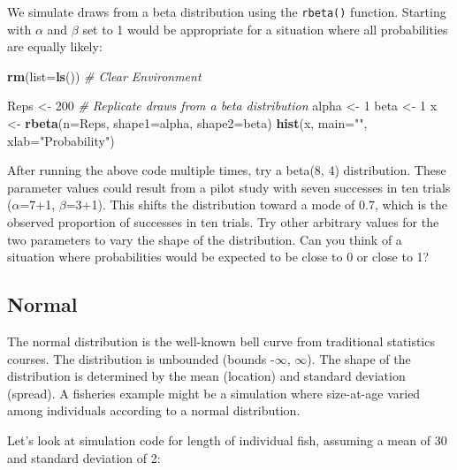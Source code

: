 \documentclass[
]{krantz}
\makeatletter
\newenvironment{Shaded}{\begin{snugshade}}{\end{snugshade}}
\newcommand{\AttributeTok}[1]{\textcolor[rgb]{0.27,0.27,0.27}{#1}}
\newcommand{\CommentTok}[1]{\textcolor[rgb]{0.37,0.37,0.37}{\textit{#1}}}
\newcommand{\DecValTok}[1]{\textcolor[rgb]{0.06,0.06,0.06}{#1}}
\newcommand{\FunctionTok}[1]{\textcolor[rgb]{0.27,0.27,0.27}{\textbf{#1}}}
\newcommand{\NormalTok}[1]{#1}
\newcommand{\OtherTok}[1]{\textcolor[rgb]{0.37,0.37,0.37}{#1}}
\newcommand{\StringTok}[1]{\textcolor[rgb]{0.5,0.5,0.5}{#1}}
\newenvironment{kframe}{%
\medskip{}
\setlength{\fboxsep}{.8em}
 \def\at@end@of@kframe{}%
 \ifinner\ifhmode%
  \def\at@end@of@kframe{\end{minipage}}%
  \begin{minipage}{\columnwidth}%
 \fi\fi%
 \def\FrameCommand##1{\hskip\@totalleftmargin \hskip-\fboxsep
 \colorbox{shadecolor}{##1}\hskip-\fboxsep
     \hskip-\linewidth \hskip-\@totalleftmargin \hskip\columnwidth}%
 \MakeFramed {\advance\hsize-\width
   \@totalleftmargin\z@ \linewidth\hsize
   \@setminipage}}%
 {\par\unskip\endMakeFramed%
 \at@end@of@kframe}
\renewenvironment{Shaded}{\begin{kframe}}{\end{kframe}}
\makeatother
\begin{document}
We simulate draws from a beta distribution using the \texttt{rbeta()} function. Starting with \(\alpha\) and \(\beta\) set to 1 would be appropriate for a situation where all probabilities are equally likely:

\begin{Shaded}
\begin{Highlighting}[]
\FunctionTok{rm}\NormalTok{(}\AttributeTok{list=}\FunctionTok{ls}\NormalTok{()) }\CommentTok{\# Clear Environment}

\NormalTok{Reps }\OtherTok{\textless{}{-}} \DecValTok{200} \CommentTok{\# Replicate draws from a beta distribution}
\NormalTok{alpha }\OtherTok{\textless{}{-}} \DecValTok{1}
\NormalTok{beta }\OtherTok{\textless{}{-}} \DecValTok{1}
\NormalTok{x }\OtherTok{\textless{}{-}} \FunctionTok{rbeta}\NormalTok{(}\AttributeTok{n=}\NormalTok{Reps, }\AttributeTok{shape1=}\NormalTok{alpha, }\AttributeTok{shape2=}\NormalTok{beta)}
\FunctionTok{hist}\NormalTok{(x, }\AttributeTok{main=}\StringTok{""}\NormalTok{, }\AttributeTok{xlab=}\StringTok{"Probability"}\NormalTok{)}
\end{Highlighting}
\end{Shaded}

After running the above code multiple times, try a beta(8, 4) distribution. These parameter values could result from a pilot study with seven successes in ten trials (\(\alpha\)=7+1, \(\beta\)=3+1). This shifts the distribution toward a mode of 0.7, which is the observed proportion of successes in ten trials. Try other arbitrary values for the two parameters to vary the shape of the distribution. Can you think of a situation where probabilities would be expected to be close to 0 or close to 1?

\hypertarget{normal}{%
\subsection{Normal}\label{normal}}

The normal distribution is the well-known bell curve from traditional statistics courses. The distribution is unbounded (bounds -\(\infty\), \(\infty\)). The shape of the distribution is determined by the mean (location) and standard deviation (spread). A fisheries example might be a simulation where size-at-age varied among individuals according to a normal distribution.

Let's look at simulation code for length of individual fish, assuming a mean of 30 and standard deviation of 2:
\end{document}
